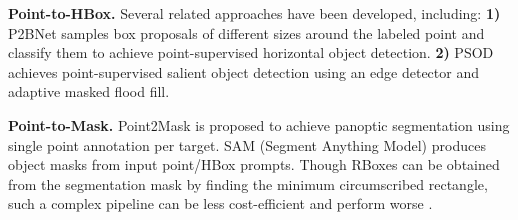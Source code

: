 \textbf{Point-to-HBox.} Several related approaches have been developed, including: \textbf{1)} P2BNet \citep{chen2022pointtobox} samples box proposals of different sizes around the labeled point and classify them to achieve point-supervised horizontal object detection. \textbf{2)} PSOD \citep{gao2022weakly} achieves point-supervised salient object detection using an edge detector and adaptive masked flood fill.

\textbf{Point-to-Mask.} Point2Mask \citep{li2023point2mask} is proposed to achieve panoptic segmentation using single point annotation per target. SAM (Segment Anything Model) \citep{kirillov2023segment} produces object masks from input point/HBox prompts. Though RBoxes can be obtained from the segmentation mask by finding the minimum circumscribed rectangle, such a complex pipeline can be less cost-efficient and perform worse \citep{yang2023h2rbox, yu2023h2rboxv2}.

